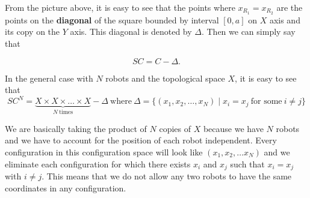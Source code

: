 \documentclass[12pt]{article}
\theoremstyle{definition}
\begin{document}
\begin{figure}[H]
\centering
{}
\end{figure}

From the picture above, it is easy to see that the points where $x_{R_1} = x_{R_2}$
are the points on the \textbf{diagonal} of the square bounded by interval $[0, a]$ on $X$ axis
and its copy on the $Y$ axis. This diagonal is denoted by $\Delta$. Then we can simply
say that

$$SC = C - \Delta.$$

In the general case with $N$ robots and the topological space $X$, it is easy to see that
$$SC^N = \underbrace{X \times X \times \dots \times X}_{N \ \text{times}} - \Delta \ \text{where} \ \Delta = \{(x_1, x_2, \dots, x_N) \mid x_i = x_j \ \text{for some} \ i \neq j\}$$

We are basically taking the product of $N$ copies of $X$ because we have $N$ robots
and we have to account for the position of each robot independent. Every configuration
in this configuration space will look like $(x_1, x_2, \dots x_N)$ and we eliminate each
configuration for which there exists $x_i$ and $x_j$ such that $x_i = x_j$ with $i \neq j$.
This means that we do not allow any two robots to have the same coordinates in any configuration.

\end{document}
